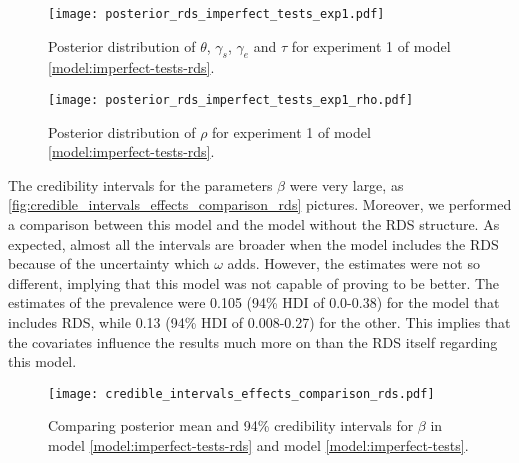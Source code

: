 \begin{figure}
  \centering
  \caption{\label{fig:posterior_rds_imperfect_tests_exp1}Posterior distribution of
    $\theta$, $\gamma_s$, $\gamma_e$ and $\tau$ for experiment 1 of model
    \eqref{model:imperfect-tests-rds}.}
  \texttt{[image: posterior\_rds\_imperfect\_tests\_exp1.pdf]}
\end{figure}

\begin{figure}
  \centering
  \caption{\label{fig:posterior_rds_imperfect_tests_exp1_rho}Posterior distribution of
    $\rho$ for experiment 1 of model \eqref{model:imperfect-tests-rds}.}
  \texttt{[image: posterior\_rds\_imperfect\_tests\_exp1\_rho.pdf]}
\end{figure}

The credibility intervals for the parameters $\beta$ were very large, as
\autoref{fig:credible_intervals_effects_comparison_rds} pictures. Moreover, we
performed
a comparison between this model and the model without the RDS structure. As
expected, almost all the intervals are broader when the model includes the RDS
because of the uncertainty which $\omega$ adds. However, the estimates were
not so different, implying that this model was not capable of proving to be
better. The estimates of the prevalence were 0.105 (94\% HDI of 0.0-0.38) for
the model that includes RDS, while 0.13 (94\% HDI of 0.008-0.27) for the
other. This implies that the covariates influence the results much more on 
than the RDS itself regarding this model. 

\begin{figure}
  \centering
  \caption{\label{fig:credible_intervals_effects_comparison_rds}Comparing
  posterior mean and 94\% credibility intervals for $\beta$ in model
  \eqref{model:imperfect-tests-rds} and model \eqref{model:imperfect-tests}.}
  \texttt{[image: credible\_intervals\_effects\_comparison\_rds.pdf]}
\end{figure}


